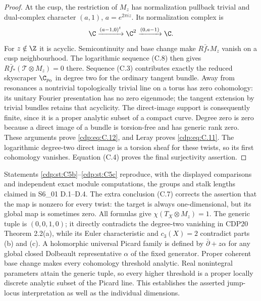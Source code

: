 \begin{proof}
At the cusp, the restriction of $M_z$ has normalization pullback trivial and dual-complex character $(a,1)$, $a=e^{2\pi iz}$. Its normalization complex is
\[
 \C\xrightarrow{(a-1,0)^t}\C^2
 \xrightarrow{(0,a-1)}\C.
\]
For $z\notin\Z$ it is acyclic. Semicontinuity and base change make $R\bar f_*M_z$ vanish on a cusp neighbourhood. The logarithmic sequence (C.8) then gives $R\bar f_*(\mathcal T\otimes M_z)=0$ there. Sequence (C.3) contributes exactly the reduced skyscraper $\C_{p_0}$ in degree two for the ordinary tangent bundle. Away from resonances a nontrivial topologically trivial line on a torus has zero cohomology: its unitary Fourier presentation has no zero eigenmode; the tangent extension by trivial bundles retains that acyclicity. The direct-image support is consequently finite, since it is a proper analytic subset of a compact curve. Degree zero is zero because a direct image of a bundle is torsion-free and has generic rank zero. These arguments prove \eqref{cdp:eq:C.12}, and Leray proves \eqref{cdp:eq:C.11}. The logarithmic degree-two direct image is a torsion sheaf for these twists, so its first cohomology vanishes. Equation (C.4) proves the final surjectivity assertion.
\end{proof}

Statements \ref{cdp:st:C5b}--\ref{cdp:st:C5c} reproduce, with the displayed comparisons and independent exact module computations, the groups and stalk lengths claimed in S6\_01 D.1--D.4. The extra conclusion (C.7) corrects the assertion that the map is nonzero for every twist: the target is always one-dimensional, but its global map is sometimes zero. All formulas give $\chi(T_X\otimes M_z)=1$. The generic tuple is $(0,0,1,0)$; it directly contradicts the degree-two vanishing in CDP20 Theorem 2.2(a), while its Euler characteristic and $c_3(X)=2$ contradict parts (b) and (c). A holomorphic universal Picard family is defined by $\bar\partial+z\alpha$ for any global closed Dolbeault representative $\alpha$ of the fixed generator. Proper coherent base change makes every cohomology threshold analytic. Real nonintegral parameters attain the generic tuple, so every higher threshold is a proper locally discrete analytic subset of the Picard line. This establishes the asserted jump-locus interpretation as well as the individual dimensions.


